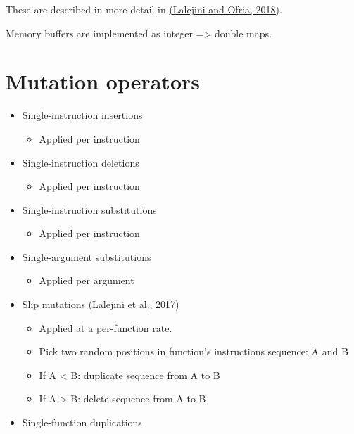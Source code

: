 \documentclass[
]{book}
\providecommand{\tightlist}{%
  \setlength{\itemsep}{0pt}\setlength{\parskip}{0pt}}
\begin{document}
These are described in more detail in \href{https://doi.org/10.1145/3205455.3205523}{(Lalejini and Ofria, 2018)}.

Memory buffers are implemented as integer =\textgreater{} double maps.

\hypertarget{mutation-operators}{%
\section{Mutation operators}\label{mutation-operators}}

\begin{itemize}
\tightlist
\item
  Single-instruction insertions

  \begin{itemize}
  \tightlist
  \item
    Applied per instruction
  \end{itemize}
\item
  Single-instruction deletions

  \begin{itemize}
  \tightlist
  \item
    Applied per instruction
  \end{itemize}
\item
  Single-instruction substitutions

  \begin{itemize}
  \tightlist
  \item
    Applied per instruction
  \end{itemize}
\item
  Single-argument substitutions

  \begin{itemize}
  \tightlist
  \item
    Applied per argument
  \end{itemize}
\item
  Slip mutations \href{https://doi.org/10.7551/ecal_a_045}{(Lalejini et al., 2017)}

  \begin{itemize}
  \tightlist
  \item
    Applied at a per-function rate.
  \item
    Pick two random positions in function's instructions sequence: A and B
  \item
    If A \textless{} B: duplicate sequence from A to B
  \item
    If A \textgreater{} B: delete sequence from A to B
  \end{itemize}
\item
  Single-function duplications


\end{itemize}
\end{document}

